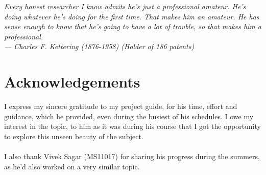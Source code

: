 
\begin{flushright}{\slshape    
Every honest researcher I know admits he's just a professional amateur.
He's doing whatever he's doing for the first time. That makes him an amateur.
He has sense enough to know that he's going to have a lot of trouble,
so that makes him a professional.\\ \medskip
--- Charles F. Kettering (1876-1958) (Holder of 186 patents)}
\end{flushright}



\bigskip

\begingroup
\let\clearpage\relax
\let\cleardoublepage\relax
\let\cleardoublepage\relax
\chapter*{Acknowledgements}
I express my sincere gratitude to my project guide, \myProf for his time, effort and guidance, which he provided, even during the busiest of his schedules. I owe my interest in the topic, to him as it was during his course that I got the opportunity to explore this unseen beauty of the subject.\\
 \\
I also thank Vivek Sagar (MS11017) for sharing his progress during the summers, as he'd also worked on a very similar topic. \\
\bigskip


\endgroup



